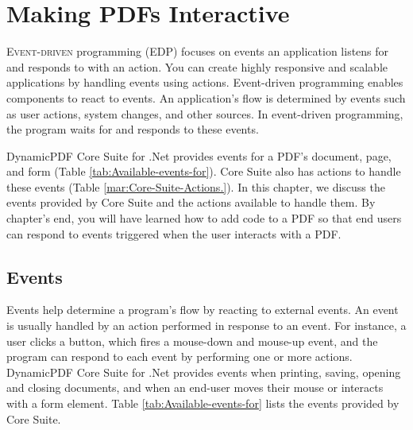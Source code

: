 \documentclass[american]{tufte-book}
\numberwithin{equation}{section}
\numberwithin{figure}{section}
\def\color#1{}%
\begin{document}
{\color{white}
\chapter{Making PDFs Interactive}\label{chap:Actions-and-Events}
\color{black}
\BgThispage
\vspace{8.0em}
\lettrine[lines=2,lhang=0.1]{E}{vent-driven} programming (EDP) focuses on events an application listens
for and responds to with an action. You can create highly responsive
and scalable applications by handling events using actions. Event-driven
programming enables components to react to events. An application's
flow is determined by events such as user actions, system changes,
and other sources. In event-driven programming, the program waits
for and responds to these events.

DynamicPDF Core Suite for .Net provides events for a PDF's document,
page, and form (Table \ref{tab:Available-events-for}). Core Suite
also has actions to handle these events (Table \ref{mar:Core-Suite-Actions.}).
In this chapter, we discuss the events provided by Core Suite and
the actions available to handle them. By chapter's end, you will have
learned how to add code to a PDF so that end users can respond to
events triggered when the user interacts with a PDF.

\section{Events}

Events help determine a program's flow by reacting to external events.
An event is usually handled by an action performed in response to
an event. For instance, a user clicks a button, which fires a mouse-down
and mouse-up event, and the program can respond to each event by performing
one or more actions. DynamicPDF Core Suite for .Net provides events
when printing, saving, opening and closing documents, and when an
end-user moves their mouse or interacts with a form element. Table
\ref{tab:Available-events-for} lists the events provided by Core
Suite.

}
\end{document}

